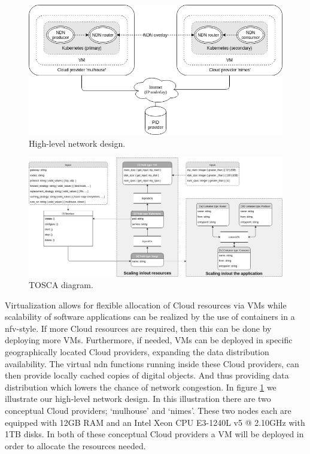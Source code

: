 \documentclass[conference]{IEEEtran}
\begin{document}
\begin{figure}[H]
\centering
\includegraphics[width=\columnwidth]{images/high-level-network-design.png}
\caption{High-level network design.}
\label{fig:high-level-network-design}
\end{figure}

\begin{figure}[ht]
\centering
\includegraphics[width=\textwidth]{images/tosca-diagram.png}
\caption{TOSCA diagram.}
\label{fig:tosca-diagram}
\end{figure}

Virtualization allows for flexible allocation of Cloud resources via VMs while scalability of software applications can be realized by the use of containers in a \gls{nfv}-style. If more Cloud resources are required, then this can be done by deploying more VMs. Furthermore, if needed, VMs can be deployed in specific geographically located Cloud providers, expanding the data distribution availability. The virtual \gls{ndn} functions running inside these Cloud providers, can then provide locally cached copies of digital objects. And thus providing data distribution which lowers the chance of network congestion. In figure \ref{fig:high-level-network-design} we illustrate our high-level network design. In this illustration there are two conceptual Cloud providers; `mulhouse' and `nimes'. These two nodes each are equipped with 12GB RAM and an Intel Xeon CPU E3-1240L v5 @ 2.10GHz with 1TB disks. In both of these conceptual Cloud providers a VM will be deployed in order to allocate the resources needed.
\end{document}
